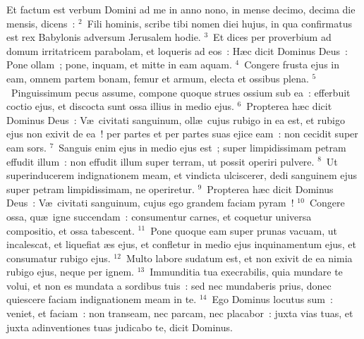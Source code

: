 \lettrine[lines=10,image=true,loversize=0.05,lraise=-0.03]{E}{}t factum est verbum Domini ad me in anno nono, in mense decimo, decima die mensis, dicens~:
${}^{2}$~Fili hominis, scribe tibi nomen diei hujus, in qua confirmatus est rex Babylonis adversum Jerusalem hodie.
${}^{3}$~Et dices per proverbium ad domum irritatricem parabolam, et loqueris ad eos~: H\ae c dicit Dominus Deus~: Pone ollam~; pone, inquam, et mitte in eam aquam.
${}^{4}$~Congere frusta ejus in eam, omnem partem bonam, femur et armum, electa et ossibus plena.
${}^{5}$~Pinguissimum pecus assume, compone quoque strues ossium sub ea~: efferbuit coctio ejus, et discocta sunt ossa illius in medio ejus.
${}^{6}$~Propterea h\ae c dicit Dominus Deus~: V\ae\ civitati sanguinum, oll\ae\ cujus rubigo in ea est, et rubigo ejus non exivit de ea~! per partes et per partes suas ejice eam~: non cecidit super eam sors.
${}^{7}$~Sanguis enim ejus in medio ejus est~; super limpidissimam petram effudit illum~: non effudit illum super terram, ut possit operiri pulvere.
${}^{8}$~Ut superinducerem indignationem meam, et vindicta ulciscerer, dedi sanguinem ejus super petram limpidissimam, ne operiretur.
${}^{9}$~Propterea h\ae c dicit Dominus Deus~: V\ae\ civitati sanguinum, cujus ego grandem faciam pyram~!
${}^{10}$~Congere ossa, qu\ae\ igne succendam~: consumentur carnes, et coquetur universa compositio, et ossa tabescent.
${}^{11}$~Pone quoque eam super prunas vacuam, ut incalescat, et liquefiat \ae s ejus, et confletur in medio ejus inquinamentum ejus, et consumatur rubigo ejus.
${}^{12}$~Multo labore sudatum est, et non exivit de ea nimia rubigo ejus, neque per ignem.
${}^{13}$~Immunditia tua execrabilis, quia mundare te volui, et non es mundata a sordibus tuis~: sed nec mundaberis prius, donec quiescere faciam indignationem meam in te.
${}^{14}$~Ego Dominus locutus sum~: veniet, et faciam~: non transeam, nec parcam, nec placabor~: juxta vias tuas, et juxta adinventiones tuas judicabo te, dicit Dominus.


